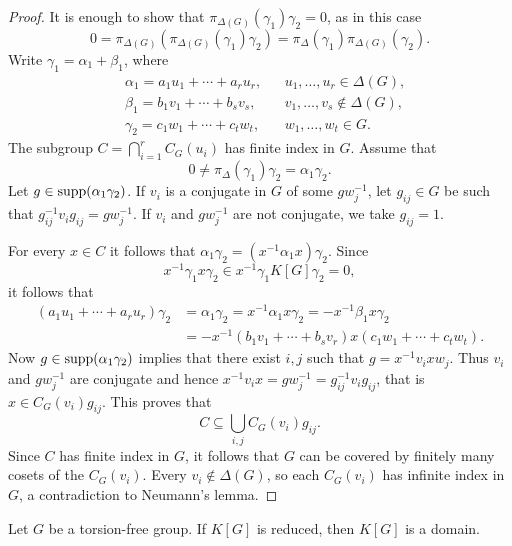 \begin{proof}
	It is enough to show that $\pi_{\Delta(G)}(\gamma_1)\gamma_2=0$, 
	as in this case
	\[
		0=\pi_{\Delta(G)}(\pi_{\Delta(G)}(\gamma_1)\gamma_2)=\pi_{\Delta}(\gamma_1)\pi_{\Delta(G)}(\gamma_2).
	\]
	Write $\gamma_1=\alpha_1+\beta_1$, where 
	\begin{align*}
		&\alpha_1=a_1u_1+\cdots+a_ru_r, && u_1,\dots,u_r\in\Delta(G),\\
		&\beta_1=b_1v_1+\cdots+b_sv_s, && v_1,\dots,v_s\not\in\Delta(G),\\
		&\gamma_2=c_1w_1+\cdots+c_tw_t,&& w_1,\dots,w_t\in G.
	\end{align*}
	The subgroup $C=\bigcap_{i=1}^rC_G(u_i)$ has finite index in $G$.
	Assume that 
	\[
		0\ne \pi_{\Delta}(\gamma_1)\gamma_2=\alpha_1\gamma_2. 
	\]
	Let $g\in\operatorname{supp}(\alpha_1\gamma_2)$. 
	If $v_i$ is a conjugate in $G$ of some 
	$gw_j^{-1}$, let $g_{ij}\in G$ be such that
	$g_{ij}^{-1}v_ig_{ij}=gw_j^{-1}$. If $v_i$ and $gw_j^{-1}$ 
	are not conjugate, 
	we take $g_{ij}=1$. 

	For every $x\in C$ it follows that
	$\alpha_1\gamma_2=(x^{-1}\alpha_1x)\gamma_2$. Since  
	\[
		x^{-1}\gamma_1x\gamma_2\in x^{-1}\gamma_1K[G]\gamma_2=0,
	\]
	it follows that
	\begin{align*}
		(a_1u_1+\cdots+a_ru_r)\gamma_2&=
		\alpha_1\gamma_2=x^{-1}\alpha_1x\gamma_2=-x^{-1}\beta_1x\gamma_2\\
		&=-x^{-1}(b_1v_1+\cdots+b_sv_r)x(c_1w_1+\cdots+c_tw_t).
	\end{align*}
	Now $g\in\operatorname{supp}(\alpha_1\gamma_2)$ implies that there exist $i,j$ such that
	$g=x^{-1}v_ixw_j$.
	Thus $v_i$ and $gw_j^{-1}$ are conjugate and hence
	$x^{-1}v_ix=gw_j^{-1}=g_{ij}^{-1}v_ig_{ij}$, that is
	$x\in C_G(v_i)g_{ij}$. This proves that 
	\[
		C\subseteq\bigcup_{i,j}C_G(v_i)g_{ij}. 
	\]
	Since $C$ has finite index in $G$, it follows that 
	$G$ can be covered by finitely many cosets of 
	the $C_G(v_i)$. Every $v_i\not\in\Delta(G)$, so 
	each $C_G(v_i)$ has infinite index in $G$, a contradiction 
	to Neumann's lemma.
\end{proof}

\begin{theorem}[Passman]
	Let $G$ be a torsion-free group. If 
	$K[G]$ is reduced, then $K[G]$ is a domain.
\end{theorem}

